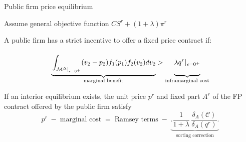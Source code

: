 \documentclass{class}
\begin{document}
\begin{frame}{Public firm price equilibrium}\label{RamseyOutside}

Assume general objective function $CS^r + (1+\lambda) \pi^r$

\vfill

\begin{proposition}\label{prop:sufficientcod}
A public firm has a strict incentive to offer a fixed price contract if: 

\begin{equation*}
    \underbrace{\Bigg. \int_{\mathcal{M}^\Delta|_{\epsilon = 0^+}} (v_2 - p_2) f_1(p_1 ) f_2(v_2 ) dv_2\Bigg.  }_{\text{marginal benefit}} > \underbrace{\Bigg. \lambda q^r|_{\epsilon = 0^+}\Bigg. }_{\text{inframarginal cost}}  \label{con_exi_FP}
\end{equation*}

\end{proposition}

\vfill


\begin{proposition}\label{prop:eqFPPublic}
If an interior equilibrium exists, the unit price $p^r$ and fixed part $A^r$ of the FP contract offered by the public firm satisfy
\begin{equation*}\label{eq1}
p^r\;-\; \text{marginal cost}\;=\; \text{Ramsey terms} \;-\; \underbrace{\Bigg. \frac{1}{1+\lambda}\,\frac{\delta_{A}(\mathcal{C})}{\delta_{A}(q^r)} \Bigg.}_{\text{sorting correction}}
\end{equation*}

\end{proposition}



\end{frame}



\end{document}
